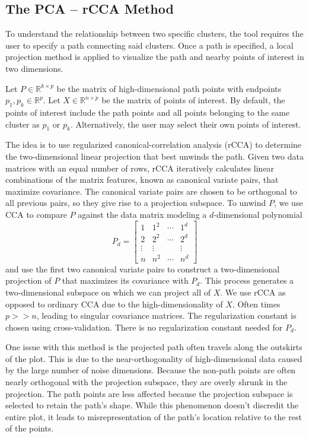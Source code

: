\documentclass{article}
\begin{document}
\subsection{The PCA -- rCCA Method}
To understand the relationship between two specific clusters, the tool requires the user to specify a path connecting said clusters. Once a path is specified, a local projection method is applied to visualize the path and nearby points of interest in two dimensions.

Let $P \in \mathbb{R}^{k \times p}$ be the matrix of high-dimensional path points with endpoints $p_1, p_k \in \mathbb{R}^p$. Let $X \in \mathbb{R}^{n \times p}$ be the matrix of points of interest. By default, the points of interest include the path points and all points belonging to the same cluster as $p_1$ or $p_k$. Alternatively, the user may select their own points of interest.

The idea is to use regularized canonical-correlation analysis (rCCA) to determine the two-dimensional linear projection that best unwinds the path. Given two data matrices with an equal number of rows, rCCA iteratively calculates linear combinations of the matrix features, known as canonical variate pairs, that maximize covariance. The canonical variate pairs are chosen to be orthogonal to all previous pairs, so they give rise to a projection subspace. To unwind $P$, we use CCA to compare $P$ against the data matrix modeling a $d$-dimensional polynomial $$P_d = \begin{bmatrix}
1 & 1^2 & \cdots & 1^d \\
2 & 2^2 & \cdots & 2^d \\
\vdots & \vdots & & \vdots \\
n & n^2 & \cdots & n^d
\end{bmatrix}$$
and use the first two canonical variate pairs to construct a two-dimensional projection of $P$ that maximizes its covariance with $P_d$. This process generates a two-dimensional subspace on which we can project all of $X$. We use rCCA as opposed to ordinary CCA due to the high-dimensionality of $X$. Often times $p >> n$, leading to singular covariance matrices. The regularization constant is chosen using cross-validation. There is no regularization constant needed for $P_d$.

One issue with this method is the projected path often travels along the outskirts of the plot. This is due to the near-orthogonality of high-dimensional data \cite{near-orthogonal} caused by the large number of noise dimensions. Because the non-path points are often nearly orthogonal with the projection subspace, they are overly shrunk in the projection. The path points are less affected because the projection subspace is selected to retain the path's shape. While this phenomenon doesn't discredit the entire plot, it leads to misrepresentation of the path's location relative to the rest of the points.
\end{document}
